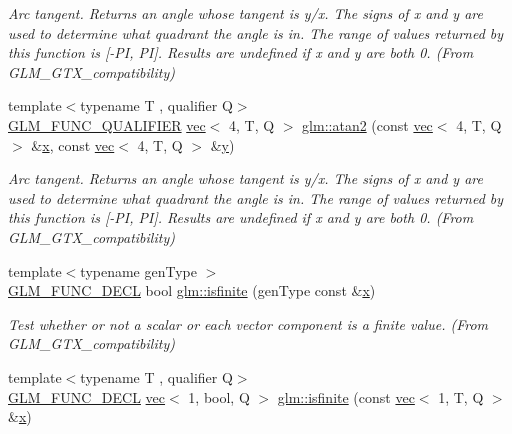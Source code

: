 \begin{DoxyCompactItemize}
\begin{DoxyCompactList}\small\item\em Arc tangent. Returns an angle whose tangent is y/x. The signs of x and y are used to determine what quadrant the angle is in. The range of values returned by this function is \mbox{[}-\/\+PI, PI\mbox{]}. Results are undefined if x and y are both 0. (From G\+L\+M\+\_\+\+G\+T\+X\+\_\+compatibility) \end{DoxyCompactList}\item 
{\footnotesize template$<$typename T , qualifier Q$>$ }\\\mbox{\hyperlink{setup_8hpp_a33fdea6f91c5f834105f7415e2a64407}{G\+L\+M\+\_\+\+F\+U\+N\+C\+\_\+\+Q\+U\+A\+L\+I\+F\+I\+ER}} \mbox{\hyperlink{structglm_1_1vec}{vec}}$<$ 4, T, Q $>$ \mbox{\hyperlink{group__gtx__compatibility_gaba86c28da7bf5bdac64fecf7d56e8ff3}{glm\+::atan2}} (const \mbox{\hyperlink{structglm_1_1vec}{vec}}$<$ 4, T, Q $>$ \&\mbox{\hyperlink{_s_d_l__opengl_8h_ad0e63d0edcdbd3d79554076bf309fd47}{x}}, const \mbox{\hyperlink{structglm_1_1vec}{vec}}$<$ 4, T, Q $>$ \&\mbox{\hyperlink{_s_d_l__opengl_8h_a1675d9d7bb68e1657ff028643b4037e3}{y}})
\begin{DoxyCompactList}\small\item\em Arc tangent. Returns an angle whose tangent is y/x. The signs of x and y are used to determine what quadrant the angle is in. The range of values returned by this function is \mbox{[}-\/\+PI, PI\mbox{]}. Results are undefined if x and y are both 0. (From G\+L\+M\+\_\+\+G\+T\+X\+\_\+compatibility) \end{DoxyCompactList}\item 
{\footnotesize template$<$typename gen\+Type $>$ }\\\mbox{\hyperlink{setup_8hpp_ab2d052de21a70539923e9bcbf6e83a51}{G\+L\+M\+\_\+\+F\+U\+N\+C\+\_\+\+D\+E\+CL}} bool \mbox{\hyperlink{group__gtx__compatibility_gaf4b04dcd3526996d68c1bfe17bfc8657}{glm\+::isfinite}} (gen\+Type const \&\mbox{\hyperlink{_s_d_l__opengl_8h_ad0e63d0edcdbd3d79554076bf309fd47}{x}})
\begin{DoxyCompactList}\small\item\em Test whether or not a scalar or each vector component is a finite value. (From G\+L\+M\+\_\+\+G\+T\+X\+\_\+compatibility) \end{DoxyCompactList}\item 
{\footnotesize template$<$typename T , qualifier Q$>$ }\\\mbox{\hyperlink{setup_8hpp_ab2d052de21a70539923e9bcbf6e83a51}{G\+L\+M\+\_\+\+F\+U\+N\+C\+\_\+\+D\+E\+CL}} \mbox{\hyperlink{structglm_1_1vec}{vec}}$<$ 1, bool, Q $>$ \mbox{\hyperlink{group__gtx__compatibility_gac3b12b8ac3014418fe53c299478b6603}{glm\+::isfinite}} (const \mbox{\hyperlink{structglm_1_1vec}{vec}}$<$ 1, T, Q $>$ \&\mbox{\hyperlink{_s_d_l__opengl_8h_ad0e63d0edcdbd3d79554076bf309fd47}{x}})

\end{DoxyCompactItemize}
